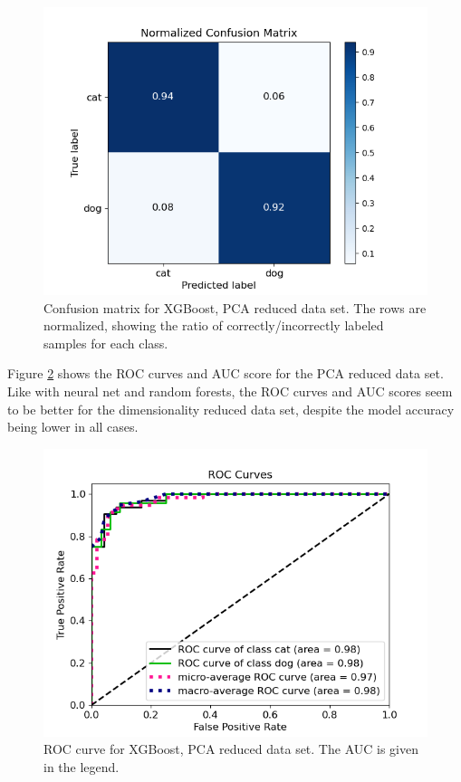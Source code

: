 \documentclass[a4paper]{article}
\begin{document}
\begin{figure}[H]
	\centering
	\includegraphics[scale=0.7]{../figures/xgboost/confusion_matrix_nbins200_pca35_seed4155_ts0.20.png}
	\caption{Confusion matrix for XGBoost, PCA reduced data set. The rows are normalized, showing the ratio of correctly/incorrectly labeled samples for each class.}
	\label{fig:xgboost_confusion_pca}
\end{figure}	
Figure \ref{fig:xgboost_roc_pca} shows the ROC curves and AUC score for the PCA reduced data set. Like with neural net and random forests, the ROC curves and AUC scores seem to be better for the dimensionality reduced data set, despite the model accuracy being lower in all cases.

\begin{figure}[H]
	\centering
	\includegraphics[scale=0.6]{../figures/xgboost/roc_nbins200_pca35_seed4155_ts0.20.png}
	\caption{ROC curve for XGBoost, PCA reduced data set. The AUC is given in the legend.}
	\label{fig:xgboost_roc_pca}
\end{figure}	
\end{document}
